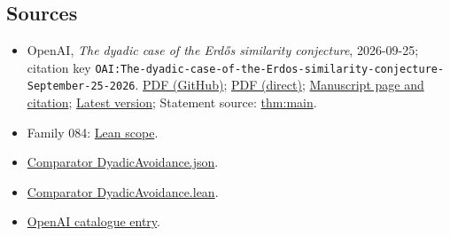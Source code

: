 \documentclass[11pt]{article}
\begin{document}
\subsection{Sources}
\begin{itemize}
\item OpenAI, \emph{The dyadic case of the Erdős similarity conjecture}, 2026-09-25; citation key \texttt{OAI:The-dyadic-case-of-the-Erdos-similarity-conjecture-September-25-2026}. \href{https://github.com/openai/math/blob/adc7f1241b42e322a6451854ab7e4b4c146bf78a/preprints/The-dyadic-case-of-the-Erdos-similarity-conjecture-September-25-2026/paper.pdf}{PDF (GitHub)}; \href{https://github.com/openai/math/raw/adc7f1241b42e322a6451854ab7e4b4c146bf78a/preprints/The-dyadic-case-of-the-Erdos-similarity-conjecture-September-25-2026/paper.pdf}{PDF (direct)}; \href{https://github.com/openai/math/blob/adc7f1241b42e322a6451854ab7e4b4c146bf78a/preprints/The-dyadic-case-of-the-Erdos-similarity-conjecture-September-25-2026/README.md}{Manuscript page and citation}; \href{https://github.com/openai/math/blob/main/preprints/The-dyadic-case-of-the-Erdos-similarity-conjecture-September-25-2026/paper.pdf}{Latest version}; Statement source: \href{https://github.com/openai/math/blob/adc7f1241b42e322a6451854ab7e4b4c146bf78a/preprints/The-dyadic-case-of-the-Erdos-similarity-conjecture-September-25-2026/build/sections/introduction.tex\#L24}{thm:main}.
\item Family 084: \href{https://github.com/openai/math/blob/adc7f1241b42e322a6451854ab7e4b4c146bf78a/lean/docs/084.md}{Lean scope}.
\item \href{https://github.com/openai/math/blob/adc7f1241b42e322a6451854ab7e4b4c146bf78a/lean/ComparatorChallenges/DyadicAvoidance.json}{Comparator DyadicAvoidance.json}.
\item \href{https://github.com/openai/math/blob/adc7f1241b42e322a6451854ab7e4b4c146bf78a/lean/ComparatorChallenges/DyadicAvoidance.lean}{Comparator DyadicAvoidance.lean}.
\item \href{https://github.com/openai/math/blob/adc7f1241b42e322a6451854ab7e4b4c146bf78a/CONTENTS.md}{OpenAI catalogue entry}.
\end{itemize}
\end{document}
